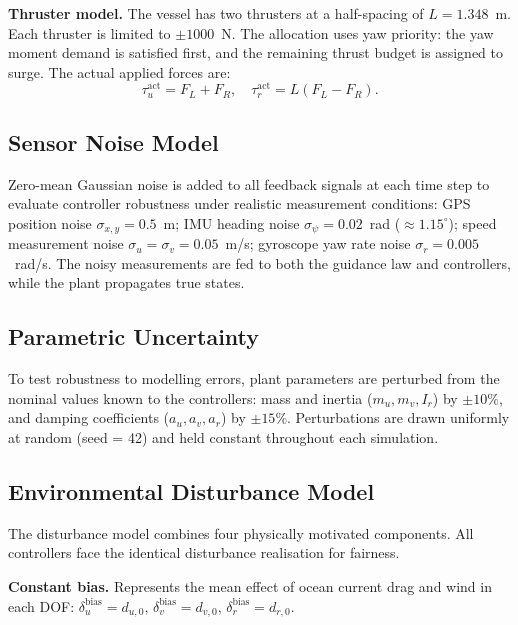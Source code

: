 \documentclass[review]{cas-dc}
\begin{document}
\textbf{Thruster model.} The vessel has two thrusters at a half-spacing of $L = 1.348$~m. Each thruster is limited to $\pm 1000$~N. The allocation uses yaw priority: the yaw moment demand is satisfied first, and the remaining thrust budget is assigned to surge. The actual applied forces are:
\begin{equation}
\tau_u^{\mathrm{act}} = F_L + F_R, \quad \tau_r^{\mathrm{act}} = L(F_L - F_R).
\label{eq:thruster}
\end{equation}


\subsection{Sensor Noise Model}
\label{sec:noise}

Zero-mean Gaussian noise is added to all feedback signals at each time step to evaluate controller robustness under realistic measurement conditions: GPS position noise $\sigma_{x,y} = 0.5$~m; IMU heading noise $\sigma_\psi = 0.02$~rad ($\approx 1.15^\circ$); speed measurement noise $\sigma_u = \sigma_v = 0.05$~m/s; gyroscope yaw rate noise $\sigma_r = 0.005$~rad/s. The noisy measurements are fed to both the guidance law and controllers, while the plant propagates true states.


\subsection{Parametric Uncertainty}
\label{sec:uncertainty}

To test robustness to modelling errors, plant parameters are perturbed from the nominal values known to the controllers: mass and inertia ($m_u, m_v, I_r$) by $\pm 10\%$, and damping coefficients ($a_u, a_v, a_r$) by $\pm 15\%$. Perturbations are drawn uniformly at random (seed = 42) and held constant throughout each simulation.


\subsection{Environmental Disturbance Model}
\label{sec:disturbance}

The disturbance model combines four physically motivated components. All controllers face the identical disturbance realisation for fairness.

\textbf{Constant bias.} Represents the mean effect of ocean current drag and wind in each DOF: $\delta_u^{\mathrm{bias}} = d_{u,0}$, $\delta_v^{\mathrm{bias}} = d_{v,0}$, $\delta_r^{\mathrm{bias}} = d_{r,0}$.
\end{document}

